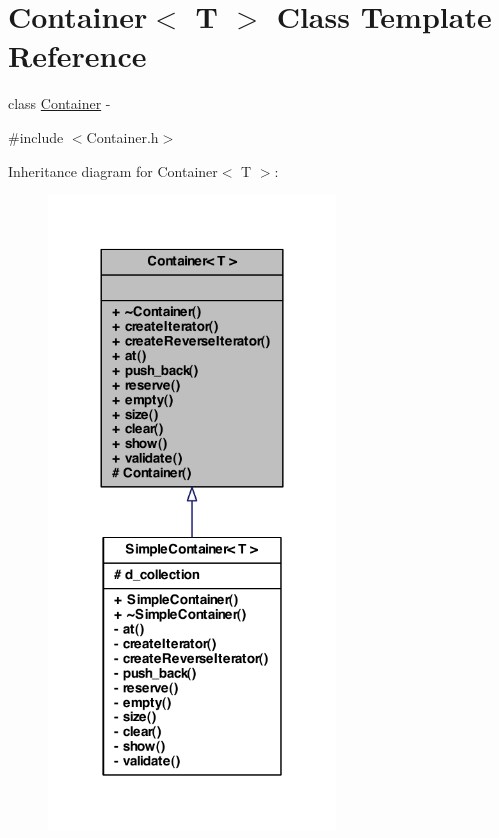 \hypertarget{class_container}{
\section{Container$<$ T $>$ Class Template Reference}
\label{class_container}
}


class \hyperlink{class_container}{Container} -\/  




{\ttfamily \#include $<$Container.h$>$}



Inheritance diagram for Container$<$ T $>$:
\nopagebreak
\begin{figure}[H]
\begin{center}
\leavevmode
\includegraphics[width=216pt]{class_container__inherit__graph}
\end{center}
\end{figure}
